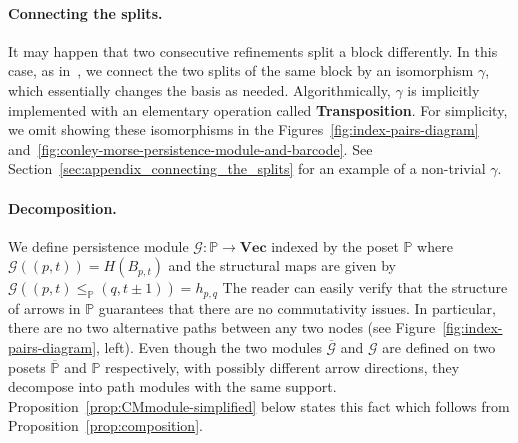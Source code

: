\documentclass[letterpaper,11pt]{article}
\theoremstyle{plain}
\theoremstyle{definition}
\def\mathobj#1{\mbox{$#1$}}
\def\PP{\mathobj{\mathbb{P}}}
\newcounter{li}
\newcommand{\VecSp}{\mathbf{Vec}}
\newcommand{\bl}{B}
\begin{document}
\paragraph{Connecting the splits.} 
It may happen that two consecutive refinements split a block differently.
In this case, as in~\cite{CMbarcodes2025}, we connect the two splits of the
same block by an isomorphism $\gamma$, which essentially changes the basis as needed. Algorithmically, $\gamma$ is implicitly implemented with an elementary operation called
\textbf{Transposition}. For simplicity, we omit showing these isomorphisms in the Figures~\ref{fig:index-pairs-diagram} and~\ref{fig:conley-morse-persistence-module-and-barcode}.
See Section~\ref{sec:appendix_connecting_the_splits} for an example of a non-trivial $\gamma$.


\paragraph{Decomposition.}
We define persistence module $\mathcal{G}: \mathbb{P}\rightarrow \VecSp$ indexed
by the poset $\mathbb{P}$ where $\mathcal G((p,t))=H(B_{p,t})$ and the structural maps are given by $\mathcal G((p,t)\leq_{\mathbb{P}} (q,t\pm 1))=h_{p,q}$ 
The reader can easily verify that the structure of arrows in $\PP$ guarantees that there are no commutativity issues. 
    In particular, there are no two alternative paths between any two nodes (see Figure~\ref{fig:index-pairs-diagram}, left).
Even though the
two modules $\overline{\mathcal G}$ and
$\mathcal G$ are defined on two posets $\overline{\mathbb{P}}$ and $\mathbb{P}$ respectively, with possibly different arrow directions, they decompose into path modules with the same support. Proposition~\ref{prop:CMmodule-simplified}
below states this fact which follows from Proposition~\ref{prop:composition}.
\end{document}
